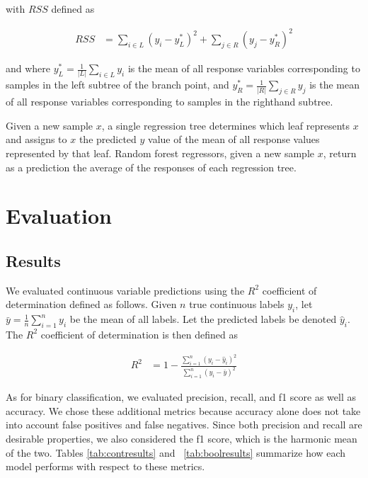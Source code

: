\documentclass{article} %
\begin{document}
with $RSS$ defined as

\begin{align*}
  RSS &= \sum_{i \in L} (y_i - y_L^*)^2 + \sum_{j \in R} (y_j - y_R^*)^2
\end{align*}

and where $y_L^* = \frac{1}{\lvert L \rvert} \sum_{i \in L} y_i $ is the mean of all response variables corresponding to samples in the left subtree of the branch point, and $y_R^* = \frac{1}{\lvert R \rvert} \sum_{j \in R} y_j$ is the mean of all response variables corresponding to samples in the righthand subtree.

Given a new sample $x$, a single regression tree determines which leaf represents $x$ and assigns to $x$ the predicted $y$ value of the mean of all response values represented by that leaf. Random forest regressors, given a new sample $x$, return as a prediction the average of the responses of each regression tree.

\section{Evaluation}
\label{sec:evaluation}

\subsection{Results}
\label{sec:results}

We evaluated continuous variable predictions using the $R^2$ coefficient of determination defined as follows. Given $n$ true continuous labels $y_i$, let $\bar{y} = \frac{1}{n}\sum_{i=1}^n y_i$ be the mean of all labels. Let the predicted labels be denoted $\hat{y}_i$. The $R^2$ coefficient of determination is then defined as

\begin{align*}
  R^2 &= 1 - \frac{\sum_{i=1}^n (y_i - \hat{y}_i)^2}{\sum_{i=1}^n (y_i - \bar{y})^2}
\end{align*}

As for binary classification, we evaluated precision, recall, and f1 score as well as accuracy. We chose these additional metrics because accuracy alone does not take into account false positives and false negatives. Since both precision and recall are desirable properties, we also considered the f1 score, which is the harmonic mean of the two. Tables \ref{tab:contresults} and ~\ref{tab:boolresults} summarize how each model performs with respect to these metrics.
\end{document}
